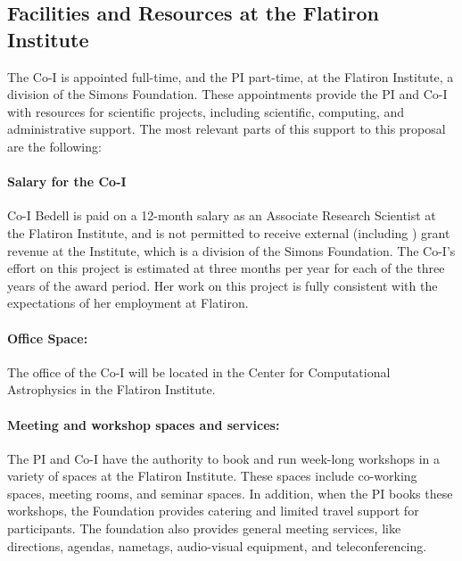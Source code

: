 \documentclass[12pt]{article}
\begin{document}
\subsection*{Facilities and Resources at the Flatiron Institute}

The Co-I is appointed full-time, and the PI part-time,
at the Flatiron Institute, a division of the Simons
Foundation.
These appointments provide the PI and Co-I with resources for
scientific projects, including scientific, computing, and
administrative support.
The most relevant parts of this support to this proposal are the
following:

\paragraph{Salary for the Co-I}

Co-I Bedell is paid on a 12-month salary as an Associate Research
Scientist at the Flatiron Institute, and is not permitted to receive
external (including \NSF) grant revenue at the Institute, which is a division of the Simons
Foundation.  The Co-I's effort on this project is estimated at three months
per year for each of the three years of the award period. Her work on
this project is fully consistent with the expectations of her
employment at Flatiron.

\paragraph{Office Space:}

The office of the Co-I will be located in the Center for Computational
Astrophysics in the Flatiron Institute.

\paragraph{Meeting and workshop spaces and services:}

The PI and Co-I have the authority to book and run week-long workshops in a variety
of spaces at the Flatiron Institute. These spaces include co-working
spaces, meeting rooms, and seminar spaces.  In addition, when the PI
books these workshops, the Foundation provides catering and limited
travel support for participants. The foundation also provides general
meeting services, like directions, agendas, nametags, audio-visual
equipment, and teleconferencing.
\end{document}
